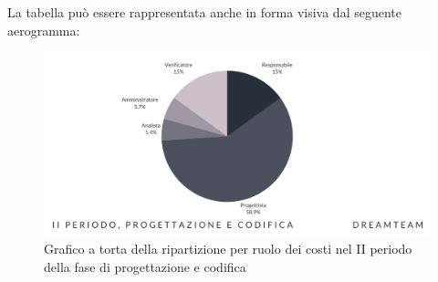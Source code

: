 La tabella può essere rappresentata anche in forma visiva dal seguente aerogramma:

\begin{figure}[H]
\centering
\includegraphics[scale=0.65]{Sezioni/SezioniPreventivo/grafici/Progettazione_II_periodo_costi.png}
\caption{Grafico a torta della ripartizione per ruolo dei costi nel II periodo della fase di progettazione e codifica}
\end{figure}


